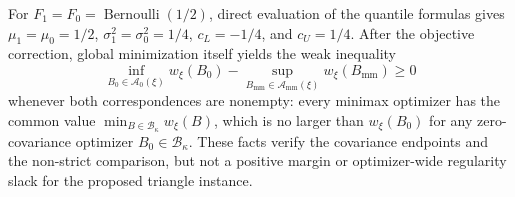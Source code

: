 For \(F_1=F_0=\operatorname{Bernoulli}(1/2)\), direct evaluation of the quantile formulas gives \(\mu_1=\mu_0=1/2\), \(\sigma_1^2=\sigma_0^2=1/4\), \(c_L=-1/4\), and \(c_U=1/4\).  After the objective correction, global minimization itself yields the weak inequality
\[
\inf_{B_0\in\mathcal A_0(\xi)}w_\xi(B_0)
-\sup_{B_{\mathrm{mm}}\in\mathcal A_{\mathrm{mm}}(\xi)}w_\xi(B_{\mathrm{mm}})\ge0
\]
whenever both correspondences are nonempty: every minimax optimizer has the common value \(\min_{B\in\mathcal B_\kappa}w_\xi(B)\), which is no larger than \(w_\xi(B_0)\) for any zero-covariance optimizer \(B_0\in\mathcal B_\kappa\).  These facts verify the covariance endpoints and the non-strict comparison, but not a positive margin or optimizer-wide regularity slack for the proposed triangle instance.